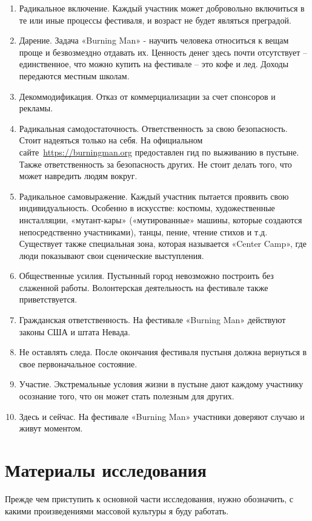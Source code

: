\documentclass[10pt,a4paper]{report}
\begin{document}
\begin{enumerate}
\item Радикальное включение. Каждый участник может добровольно
включиться в те или иные процессы фестиваля, и возраст не будет
являться преградой.
\item Дарение. Задача «Burning Man» - научить человека относиться
к вещам проще и безвозмездно отдавать их. Ценность денег здесь
почти отсутствует – единственное, что можно купить на фестивале – 
это кофе и лед. Доходы передаются местным школам.
\item Декоммодификация. Отказ от коммерциализации за счет
спонсоров и рекламы.
\item Радикальная самодостаточность. Ответственность за свою
безопасность. Стоит надеяться только на себя. На официальном
сайте~\url{https://burningman.org} предоставлен гид по выживанию в
пустыне. Также ответственность за безопасность других. Не стоит
делать того, что может навредить людям вокруг.
\item Радикальное самовыражение. Каждый участник пытается
проявить свою индивидуальность. Особенно в искусстве: костюмы,
художественные инсталляции, «мутант-кары» («мутированные» машины,
которые создаются непосредственно участниками), танцы, пение,
чтение стихов и т.д. Существует также специальная зона, которая
называется «Center Camp», где люди показывают свои сценические
выступления.
\item Общественные усилия. Пустынный город невозможно построить
без слаженной работы. Волонтерская деятельность на фестивале
также приветствуется.
\item Гражданская ответственность. На фестивале «Burning Man» 
действуют законы США и штата Невада.
\item Не оставлять следа. После окончания фестиваля пустыня
должна вернуться в свое первоначальное состояние.
\item Участие. Экстремальные условия жизни в пустыне дают каждому
участнику осознание того, что он может стать полезным для других.
\item Здесь и сейчас. На фестивале «Burning Man» участники
доверяют случаю и живут моментом.
\end{enumerate}

\section{Материалы исследования}

Прежде чем приступить к основной части исследования, нужно
обозначить, с какими произведениями массовой культуры я буду
работать.
\end{document}
